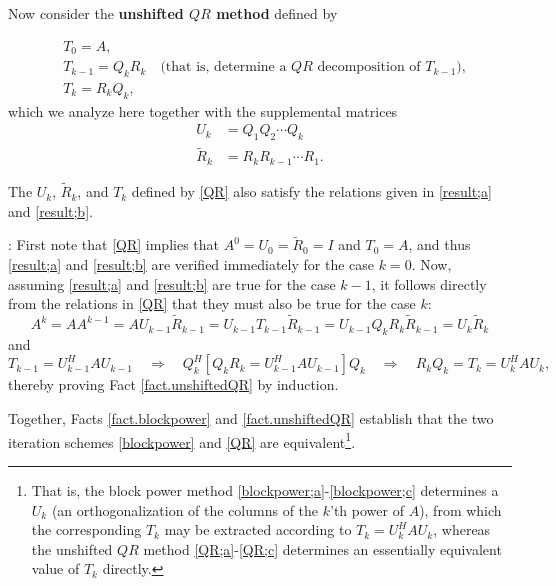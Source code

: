 Now consider the {\bf unshifted $QR$ method} defined by
\begin{subeqnA}
\label{QR}
\begin{align}
&T_{0}  =A, \label{QR;a}\\
&T_{k-1}={Q}_{k} {R}_{k} \quad \textrm{(that is, determine a $QR$ decomposition of $T_{k-1}$)},\label{QR;b}\\
&T_{k}  = {R}_{k} {Q}_{k},\label{QR;c}
\end{align}
which we analyze here together with the supplemental matrices
\begin{align}
{U}_{k}&= Q_{1} Q_{2} \cdots Q_{k} \label{QR;d}\\ 
{\widetilde R}_{k}&=R_{k} R_{k-1} \cdots R_{1}.  \label{QR;e}
\end{align}
\end{subeqnA}

\begin{fact} \label{fact.unshiftedQR}
The ${U}_{k}$, ${\widetilde R}_{k}$, and $T_{k}$ defined by \eqref{QR}
also satisfy the relations given in \eqref{result;a} and \eqref{result;b}.
\end{fact}

\/: 
First note that \eqref{QR} implies that $A^0={U}_{0}={\widetilde R}_{0}=I$ and $T_{0}=A$, and thus \eqref{result;a} and  \eqref{result;b}
are verified immediately for the case $k=0$.  Now, assuming \eqref{result;a} and \eqref{result;b} are true for the case $k-1$,
it follows directly from the relations in \eqref{QR} that they must also be true  for the case $k$:
\begin{equation*}
  A^k = A A^{k-1} = A {U}_{k-1} {\widetilde R}_{k-1} =  {U}_{k-1} T_{k-1} {\widetilde R}_{k-1} 
      = {U}_{k-1} {Q}_{k} {R}_{k} {\widetilde R}_{k-1} = {U}_{k} {\widetilde R}_{k}
\end{equation*}
and
\begin{equation*}
  T_{k-1} = {U}_{k-1}^H A {U}_{k-1} \quad \Rightarrow \quad
  {Q}_{k}^H [ {Q}_{k} {R}_{k} = {U}_{k-1}^H A {U}_{k-1} ] {Q}_{k} \quad \Rightarrow \quad
  {R}_{k} {Q}_{k} = T_{k} = {U}_{k}^H A {U}_{k},
\end{equation*}
thereby proving Fact \ref{fact.unshiftedQR} by induction. \endproof \medskip

Together, Facts \ref{fact.blockpower} and \ref{fact.unshiftedQR} establish that the two iteration schemes \eqref{blockpower}
and \eqref{QR} are equivalent\footnote{That is, the block power method \eqref{blockpower;a}-\eqref{blockpower;c} determines a $U_k$ (an orthogonalization of the columns of the $k$'th power of $A$),
from which the corresponding $T_k$ may be extracted according to $T_k=U_k^H A U_k$, whereas the unshifted $QR$ method \eqref{QR;a}-\eqref{QR;c} determines an essentially equivalent
value of $T_k$ directly.}. \vskip0.1in

